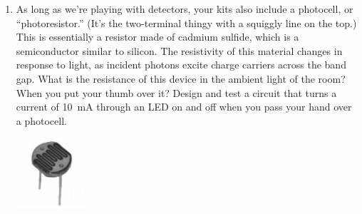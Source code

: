 \begin{enumerate}[wide]
\item As long as we're playing with detectors, your kits also include a photocell, or ``photoresistor.''  (It's the two-terminal thingy with a squiggly line on the top.) This is essentially a resistor made of cadmium sulfide, which is a semiconductor similar to silicon.  The resistivity of this material changes in response to light, as incident photons excite charge carriers across the band gap.  What is the resistance of this device in the ambient light of the room?  When you put your thumb over it?  Design and test a circuit that turns a current of 10~mA through an LED on and off  when you pass your hand over a photocell.
\begin{center}
\includegraphics[width=1in]{microphone_photocell/photocell_bw.eps}
\end{center}


\end{enumerate}
